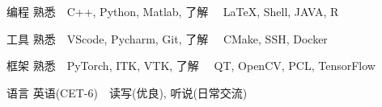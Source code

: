 

\begin{cvskills}

  \cvskill
    {编程} %
    {熟悉~~C++, Python, Matlab, 了解~~ \LaTeX, Shell, JAVA, R} %

  \cvskill
    {工具} %
    {熟悉~~VScode, Pycharm, Git, 了解~~ CMake, SSH, Docker} %

  \cvskill
    {框架} %
    {熟悉~~PyTorch, ITK, VTK, 了解~~ QT, OpenCV, PCL, TensorFlow} %

  \cvskill
    {语言} %
    {英语(CET-6)~~读写(优良), 听说(日常交流)} %

\end{cvskills}
